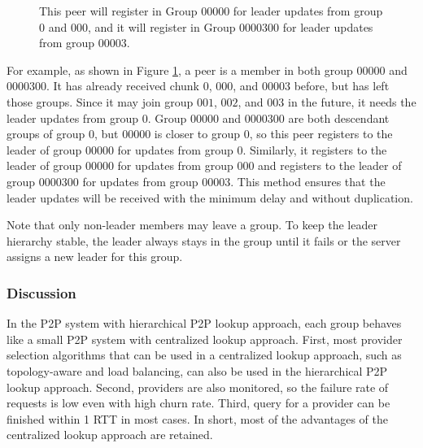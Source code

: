     \begin{figure}[t]
    \centering
    \caption[Peer register in various groups.]
    {This peer will register in Group $00000$ for leader
    updates from group $0$
    and $000$, and it will register in Group $0000300$ for leader
    updates from group $00003$. 
    \label{f:register}}
    \end{figure}
    For example, as shown in Figure \ref{f:register}, a peer is a member in both group
    $00000$ and $0000300$. It has already received chunk $0$, $000$,
    and $00003$ before, but has left those groups. Since it
    may join group $001$, $002$, and $003$ in the future, it needs the
    leader updates from group $0$. Group $00000$ and $0000300$ are
    both descendant groups of group $0$, but $00000$ is closer to group
    $0$, so this peer registers to the leader of group $00000$ %
    for updates from group $0$. 
    Similarly, it registers to the leader of 
    group $00000$ %
    for updates from group $000$
    and registers to the leader of group $0000300$ %
    for updates
    from group $00003$. 
    This method ensures that the leader updates will be received with
    the minimum delay
    and without duplication.

    Note that only non-leader members may leave a group. To keep the leader
    hierarchy stable, the leader always stays in the group until
    it fails or the server assigns a new leader for this group.
    
    \subsubsection{Discussion}
    In the P2P system with hierarchical P2P lookup approach, %
    each group behaves like a small P2P system with centralized lookup
    approach. 
    First, most provider selection algorithms that can be used in a centralized
    lookup approach, 
    such as topology-aware and load balancing, can also
    be used in the hierarchical P2P lookup approach. %
    Second, providers are also monitored, so the failure rate of requests is 
    low even with high churn rate. Third,
    query for a provider can be finished within 1 RTT in
    most cases. In short, most of the advantages of the 
    centralized lookup approach are retained.


